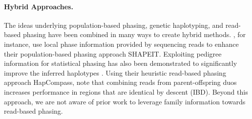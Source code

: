 \paragraph{Hybrid Approaches.}
The ideas underlying population-based phasing, genetic haplotyping, and read-based phasing have been combined in many ways to create hybrid methods.
\cite{Delaneau2013a}, for instance, use local phase information provided by sequencing reads to enhance their population-based phasing approach SHAPEIT.
Exploiting pedigree information for statistical phasing has also been demonstrated to significantly improve the inferred haplotypes \citep{Marchini2006,CDW13_exact}.
Using their heuristic read-based phasing approach HapCompass, \cite{Aguiar2013} note that combining reads from parent-offspring duos increases performance in regions that are identical by descent (IBD). 
Beyond this approach, we are not aware of prior work to leverage family information towards read-based phasing.
% 

